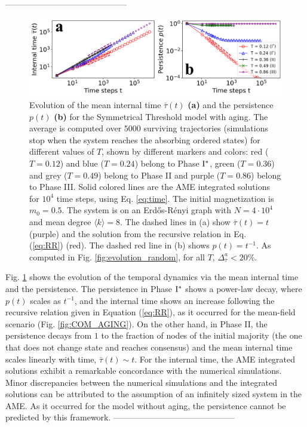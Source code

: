--------------------------------------------
\begin{figure}
    \centering \captionsetup{font=sf}
    \includegraphics[width=\textwidth]{Figs/Aging_STM/FIG6A.pdf}
    \caption[Temporal dynamics of the Symmetrical threshold model with aging]{\label{fig:evolution_temporal_aging} Evolution of the mean internal time $\bar{\tau}(t)$ \textbf{(a)} and the persistence $p(t)$ \textbf{(b)} for the Symmetrical Threshold model with aging. The average is computed over $5000$ surviving trajectories (simulations stop when the system reaches the absorbing ordered states) for different values of $T$, shown by different markers and colors: red ($T = 0.12$) and blue ($T = 0.24$) belong to Phase ${\rm I}^{*}$, green ($T = 0.36$) and grey ($T = 0.49$) belong to Phase II and purple ($T = 0.86$) belong to Phase III. Solid colored lines are the AME integrated solutions for $10^4$ time steps, using Eq. \ref{eq:time}. The initial magnetization is $m_0 = 0.5$. The system is on an Erd\H{o}s-R\'enyi graph with $N = 4 \cdot 10^4$ and mean degree $\langle k \rangle = 8$. The dashed lines in (a) show $\bar{\tau}(t) = t$ (purple) and the solution from the recursive relation in Eq. (\ref{eq:RR}) (red). The dashed red line in (b) shows $p(t) = t^{-1}$. As computed in Fig. \ref{fig:evolution_random}, for all $T$, $\Delta^{a}_{\bar{\tau}} < 20\%$.}
\end{figure}

Fig. \ref{fig:evolution_temporal_aging} shows the evolution of the temporal dynamics via the mean internal time and the persistence. The persistence in Phase ${\rm I}^{*}$ shows a power-law decay, where $p(t)$ scales as $t^{-1}$, and the internal time shows an increase following the recursive relation given in Equation (\ref{eq:RR}), as it occurred for the mean-field scenario (Fig. \ref{fig:COM_AGING}). On the other hand, in Phase II, the persistence decays from $1$ to the fraction of nodes of the initial majority (the one that does not change state and reaches consensus) and the mean internal time scales linearly with time, $\bar{\tau}(t) \sim t$. For the internal time, the AME integrated solutions exhibit a remarkable concordance with the numerical simulations. Minor discrepancies between the numerical simulations and the integrated solutions can be attributed to the assumption of an infinitely sized system in the AME. As it occurred for the model without aging, the persistence cannot be predicted by this framework.
--------------------------------------------


